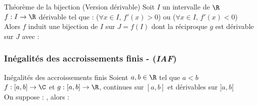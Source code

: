 \documentclass[12pt,a4paper]{report}
\begin{document}
\begin{theoreme}{Théorème de la bijection (Version dérivable)}{}
Soit $I$ un intervalle de $\R$ \\
$f:I \to \R$ dérivable tel que : ($\forall x \in I$, $f'(x)>0$) ou ($\forall x \in I$, $f'(x)<0$)\\
Alors $f$ induit une bijection de $I$ sur $J=f(I)$ dont la réciproque $g$ est dérivable sur $J$ avec :
\begin{center}
\end{center}
\end{theoreme}

\subsubsection{Inégalités des accroissements finis - (\textit{IAF})}
\begin{theoreme}{Inégalités des accroissements finis}{}
Soient $a,b\in \R$ tel que $a<b$\\
$f:[a,b]\to \C$ et $g:[a,b]\to \R$, continues sur $[a,b]$ et dérivables sur $]a,b[$\\
On suppose : \strong{$\forall t \in ]a,b[$, $\lvert f'(t) \rvert \leq g'(t)$}, alors : 
\begin{center}
\end{center}
\end{theoreme}
\end{document}
